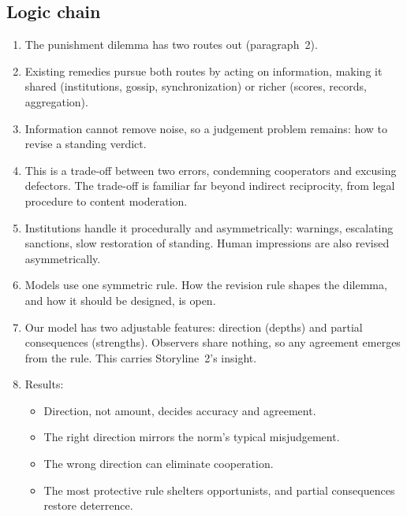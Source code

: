 \documentclass[11pt]{article}
\begin{document}
\subsection*{Logic chain}
\begin{enumerate}[leftmargin=1.5em]
\item The punishment dilemma has two routes out (paragraph~2).
\item Existing remedies pursue both routes by acting on information, making it shared (institutions, gossip, synchronization) or richer (scores, records, aggregation).
\item Information cannot remove noise, so a judgement problem remains: how to revise a standing verdict.
\item This is a trade-off between two errors, condemning cooperators and excusing defectors. The trade-off is familiar far beyond indirect reciprocity, from legal procedure to content moderation.
\item Institutions handle it procedurally and asymmetrically: warnings, escalating sanctions, slow restoration of standing. Human impressions are also revised asymmetrically.
\item Models use one symmetric rule. How the revision rule shapes the dilemma, and how it should be designed, is open.
\item Our model has two adjustable features: direction (depths) and partial consequences (strengths). Observers share nothing, so any agreement emerges from the rule. This carries Storyline~2's insight.
\item Results:
  \begin{itemize}[leftmargin=1.2em]
  \item Direction, not amount, decides accuracy and agreement.
  \item The right direction mirrors the norm's typical misjudgement.
  \item The wrong direction can eliminate cooperation.
  \item The most protective rule shelters opportunists, and partial consequences restore deterrence.
  \end{itemize}
\end{enumerate}
\end{document}
